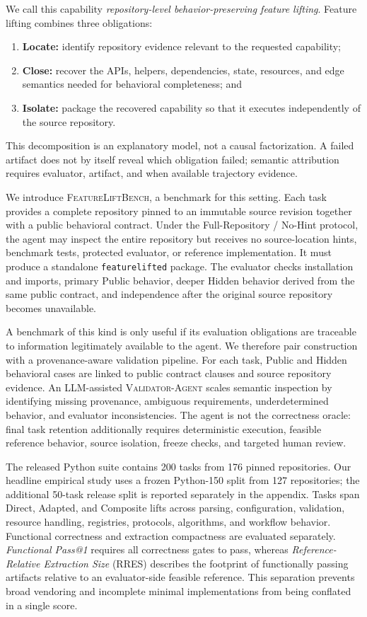 \documentclass[acmsmall,screen,review,anonymous]{acmart}
\newcommand{\flb}{\textsc{FeatureLiftBench}\xspace}
\newcommand{\rres}{\textsc{RRES}\xspace}
\newcommand{\validatoragent}{\textsc{Validator-Agent}\xspace}
\newcommand{\HeadlineRepos}{127\xspace}
\newcommand{\ReleaseTasks}{200\xspace}
\newcommand{\ReleaseRepos}{176\xspace}
\begin{document}
We call this capability \emph{repository-level behavior-preserving feature
lifting}. Feature lifting combines three obligations:
\begin{enumerate}
  \item \textbf{Locate:} identify repository evidence relevant to the requested
        capability;
  \item \textbf{Close:} recover the APIs, helpers, dependencies, state,
        resources, and edge semantics needed for behavioral completeness; and
  \item \textbf{Isolate:} package the recovered capability so that it executes
        independently of the source repository.
\end{enumerate}
This decomposition is an explanatory model, not a causal factorization. A failed
artifact does not by itself reveal which obligation failed; semantic attribution
requires evaluator, artifact, and when available trajectory evidence.

We introduce \flb, a benchmark for this setting. Each task provides a complete
repository pinned to an immutable source revision together with a public
behavioral contract. Under the Full-Repository / No-Hint protocol, the agent may
inspect the entire repository but receives no source-location hints, benchmark
tests, protected evaluator, or reference implementation. It must produce a
standalone \texttt{featurelifted} package. The evaluator checks installation and
imports, primary Public behavior, deeper Hidden behavior derived from the same
public contract, and independence after the original source repository becomes
unavailable.

A benchmark of this kind is only useful if its evaluation obligations are
traceable to information legitimately available to the agent. We therefore pair
construction with a provenance-aware validation pipeline. For each task, Public
and Hidden behavioral cases are linked to public contract clauses and source
repository evidence. An LLM-assisted \validatoragent scales semantic inspection
by identifying missing provenance, ambiguous requirements, underdetermined
behavior, and evaluator inconsistencies. The agent is not the correctness oracle:
final task retention additionally requires deterministic execution, feasible
reference behavior, source isolation, freeze checks, and targeted human review.

The released Python suite contains \ReleaseTasks tasks from \ReleaseRepos pinned repositories. Our
headline empirical study uses a frozen Python-150 split from \HeadlineRepos repositories;
the additional 50-task release split is reported separately in the appendix.
Tasks span Direct, Adapted, and Composite lifts across parsing, configuration,
validation, resource handling, registries, protocols, algorithms, and workflow
behavior. Functional correctness and extraction compactness are evaluated
separately.
\emph{Functional Pass@1} requires all correctness gates to pass, whereas
\emph{Reference-Relative Extraction Size} (\rres) describes the footprint of
functionally passing artifacts relative to an evaluator-side feasible reference.
This separation prevents broad vendoring and incomplete minimal implementations
from being conflated in a single score.
\end{document}
